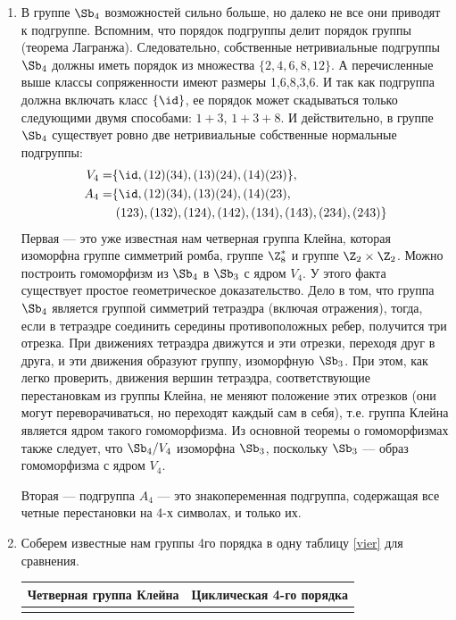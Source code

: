 \begin{enumerate}
\item В группе $\Sb_4$ возможностей сильно больше, но далеко не все они приводят к подгруппе. Вспомним, что порядок подгруппы делит порядок группы (теорема Лагранжа). Следовательно, собственные нетривиальные подгруппы $\Sb_4$ должны иметь порядок из множества $\{2,4,6,8,12\}$. А перечисленные выше классы сопряженности имеют размеры 1,6,8,3,6. И так как подгруппа должна включать класс $\{\id\}$, ее порядок может скадываться только следующими двумя способами: $1+3$, $1+3+8$. И действительно, в группе $\Sb_4$ существует ровно две нетривиальные собственные нормальные подгруппы:
\begin{align*}
V_4 = & \{\id,(12)(34),(13)(24),(14)(23)\},\\
A_4 = & \{\id,(12)(34),(13)(24),(14)(23), \\
      & \;(123),(132),(124),(142),(134),(143),(234),(243)\}
\end{align*}
Первая --- это уже известная нам четверная группа Клейна, которая изоморфна группе симметрий ромба, группе $\Z_8^*$ и группе $\Z_2\times\Z_2$. Можно построить гомоморфизм из $\Sb_4$ в $\Sb_3$ с ядром $V_4$. У этого факта существует простое геометрическое доказательство. Дело в том, что группа $\Sb_4$ является группой симметрий тетраэдра (включая отражения), тогда, если в тетраэдре соединить середины противоположных ребер, получится три отрезка. При движениях тетраэдра движутся и эти отрезки, переходя друг в друга, и эти движения образуют группу, изоморфную $\Sb_3$. При этом, как легко проверить, движения вершин тетраэдра, соответствующие перестановкам из группы Клейна, не меняют положение этих отрезков (они могут переворачиваться, но переходят каждый сам в себя), т.е. группа Клейна является ядром такого гомоморфизма. Из основной теоремы о гомоморфизмах также следует, что $\Sb_4/V_4$ изоморфна $\Sb_3$, поскольку $\Sb_3$ --- образ гомоморфизма с ядром $V_4$.

Вторая --- подгруппа $A_4$ --- это знакопеременная подгруппа, содержащая все четные перестановки на 4-х символах, и только их.

\item Соберем известные нам группы 4го порядка в одну таблицу \ref{vier} для сравнения.

\begin{table}[h!]
\begin{tabular}{c||c}
Четверная группа Клейна & Циклическая 4-го порядка \\ \hline\hline
\\


\end{tabular}
\end{table}
\end{enumerate}

